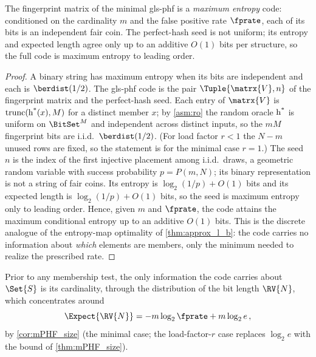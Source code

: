 \documentclass[ ../main.tex]{subfiles}
\begin{document}
\begin{theorem}
\label{thm:max_entropy_coder}
The fingerprint matrix of the minimal \gls{gls-phf} is a \emph{maximum entropy} code: conditioned on the cardinality $m$ and the false positive rate $\fprate$, each of its bits is an independent fair coin. The perfect-hash seed is not uniform; its entropy and expected length agree only up to an additive $O(1)$ bits per structure, so the full code is maximum entropy to leading order.
\end{theorem}
\begin{proof}
A binary string has maximum entropy when its bits are independent and each is $\berdist(1/2)$. The \gls{gls-phf} code is the pair $\Tuple{\matrx{V}, n}$ of the fingerprint matrix and the perfect-hash seed. Each entry of $\matrx{V}$ is $\operatorname{trunc}(\operatorname{h^*}(x), M)$ for a distinct member $x$; by \cref{asm:ro} the random oracle $\operatorname{h^*}$ is uniform on $\BitSet^M$ and independent across distinct inputs, so the $m M$ fingerprint bits are i.i.d.\ $\berdist(1/2)$. (For load factor $r < 1$ the $N - m$ unused rows are fixed, so the statement is for the minimal case $r = 1$.) The seed $n$ is the index of the first injective placement among i.i.d.\ draws, a geometric random variable with success probability $p = P(m,N)$; its binary representation is not a string of fair coins. Its entropy is $\log_2(1/p) + O(1)$ bits and its expected length is $\log_2(1/p) + O(1)$ bits, so the seed is maximum entropy only to leading order. Hence, given $m$ and $\fprate$, the code attains the maximum conditional entropy up to an additive $O(1)$ bits. This is the discrete analogue of the entropy-map optimality of \cref{thm:approx_l_b}: the code carries no information about \emph{which} elements are members, only the minimum needed to realize the prescribed rate.
\end{proof}

Prior to any membership test, the only information the code carries about $\Set{S}$ is its cardinality, through the distribution of the bit length $\RV{N}$, which concentrates around
\begin{equation}
\label{eq:phf_expected_bits}
    \Expect{\RV{N}} = -m \log_2 \fprate + m \log_2 e\,,
\end{equation}
by \cref{cor:mPHF_size} (the minimal case; the load-factor-$r$ case replaces $\log_2 e$ with the bound of \cref{thm:mPHF_size}).
\end{document}

